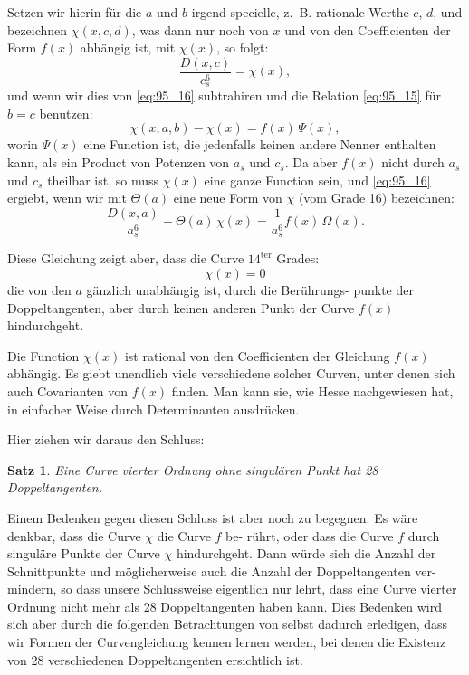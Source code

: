 \documentclass[12pt,a4paper]{article}
\theoremstyle{plain}
\newtheorem{satz}{Satz}[section]
\theoremstyle{definition}
\theoremstyle{remark}
\begin{document}
Setzen wir hierin für die $a$ und $b$ irgend specielle, z.~B.
rationale Werthe $c$, $d$, und bezeichnen $\chi(x, c, d)$, was dann nur
noch von $x$ und von den Coefficienten der Form $f(x)$ abhängig
ist, mit $\chi(x)$, so folgt:
\begin{equation*}
\frac{D(x, c)}{c_s^6} = \chi(x),
\end{equation*}
und wenn wir dies von \eqref{eq:95_16} subtrahiren und die Relation \eqref{eq:95_15}
für $b = c$ benutzen:
\begin{equation}\label{eq:95_17}
\chi(x, a, b) - \chi(x) = f(x)\, \Psi(x),
\end{equation}
worin $\Psi(x)$ eine Function ist, die jedenfalls keinen andere
Nenner enthalten kann, als ein Product von Potenzen von $a_s$
und $c_s$. Da aber $f(x)$ nicht durch $a_s$ und $c_s$ theilbar ist, so muss
$\chi(x)$ eine ganze Function sein, und \eqref{eq:95_16} ergiebt, wenn wir mit
$\Theta(a)$ eine neue Form von $\chi$ (vom Grade 16) bezeichnen:
\begin{equation}\label{eq:95_18}
\frac{D(x, a)}{a_s^6} - \Theta(a)\, \chi(x) = \frac{1}{a_s^6} f(x)\, \Omega(x).
\end{equation}

Diese Gleichung zeigt aber, dass die Curve $14^{\text{ter}}$ Grades:
\begin{equation}\label{eq:95_19}
\chi(x) = 0
\end{equation}
die von den $a$ gänzlich unabhängig ist, durch die Berührungs-
punkte der Doppeltangenten, aber durch keinen anderen Punkt
der Curve $f(x)$ hindurchgeht.

Die Function $\chi(x)$ ist rational von den Coefficienten der
Gleichung $f(x)$ abhängig. Es giebt unendlich viele verschiedene
solcher Curven, unter denen sich auch Covarianten von $f(x)$
finden. Man kann sie, wie Hesse nachgewiesen hat, in einfacher
Weise durch Determinanten ausdrücken.

Hier ziehen wir daraus den Schluss:

\begin{satz}
Eine Curve vierter Ordnung ohne singulären
Punkt hat 28 Doppeltangenten.
\end{satz}

Einem Bedenken gegen diesen Schluss ist aber noch zu
begegnen. Es wäre denkbar, dass die Curve $\chi$ die Curve $f$ be-
rührt, oder dass die Curve $f$ durch singuläre Punkte der Curve $\chi$
hindurchgeht. Dann würde sich die Anzahl der Schnittpunkte
und möglicherweise auch die Anzahl der Doppeltangenten ver-
mindern, so dass unsere Schlussweise eigentlich nur lehrt, dass
eine Curve vierter Ordnung nicht mehr als 28 Doppeltangenten
haben kann. Dies Bedenken wird sich aber durch die folgenden
Betrachtungen von selbst dadurch erledigen, dass wir Formen der
Curvengleichung kennen lernen werden, bei denen die Existenz
von 28 verschiedenen Doppeltangenten ersichtlich ist.
\end{document}
